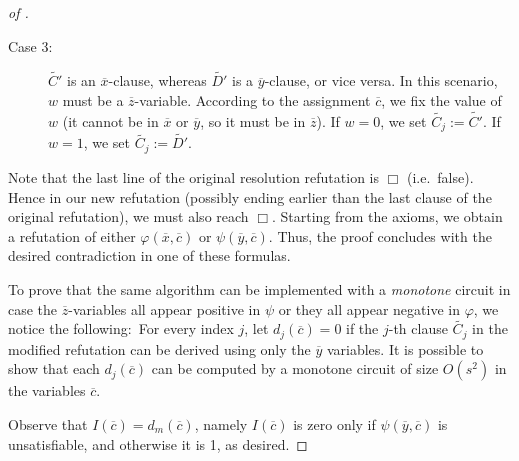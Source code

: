 \begin{proof}[of ]
\begin{description}
\item[Case 3:]
\(\widetilde{C'}\) is an \(\overline{x}\)-clause, whereas \(\widetilde{D'}\) is a \(\overline{y}\)-clause, or vice versa. In this scenario, \(w\) must be a \(\overline{z}\)-variable. According to the assignment \(\overline{c}\), we fix the value of \(w\) (it cannot be in \(\overline{x}\) or \(\overline{y}\), so it must be in \(\overline{z}\)). If \(w = 0\), we  set \(\widetilde{C_j} := \widetilde{C'}\). 
If \(w = 1\), we set \(\widetilde{C_j} := \widetilde{D'}\).


% 

\end{description}

\noindent




\medskip
Note that the last line  of the original resolution refutation is \(\Box\) (i.e.\ false). Hence in our new refutation (possibly ending earlier than the last clause of the original refutation), we must also reach \(\Box\). Starting from the axioms, we obtain a refutation of either \(\varphi(\overline{x},\overline{c})\) or \(\psi(\overline{y},\overline{c})\). 
Thus, the proof concludes with the desired contradiction in one of these formulas. 


\bigskip 

To prove that the same algorithm can be implemented with a \emph{monotone} circuit in case the $\overline z$-variables all appear positive in $\psi$ or they all appear negative in $\varphi$, we notice the following:\ For every index \(j\), let \(d_j(\overline{c}) = 0\) if the \(j\)-th clause \(\widetilde{C_j}\) in the modified refutation can be derived using only the \(\overline{y}\) variables. It is possible to show that 
 each \(d_j(\overline{c})\) can be computed by a monotone circuit of size \(O(s^2)\) in the variables \(\overline{c}\).

Observe that \(I(\overline{c}) = d_m(\overline{c})\), namely $I(\overline{c})$ is zero only if  $\psi(\overline y,\overline{c})$ is unsatisfiable, and otherwise it is 1, as desired. 
\end{proof}


